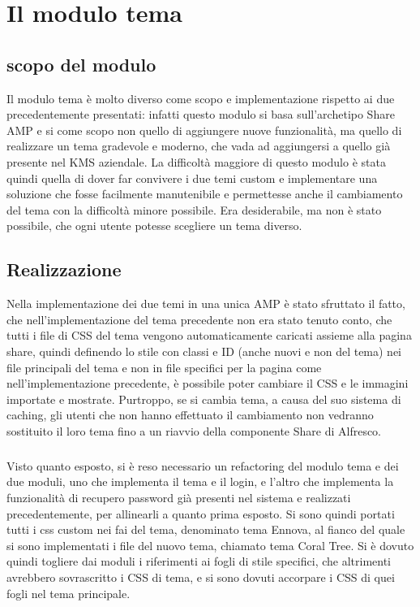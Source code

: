 
\chapter{Il modulo tema}
\label{cap:modulo-tema}

\section{scopo del modulo}
Il modulo tema è molto diverso come scopo e implementazione rispetto ai due precedentemente presentati: infatti questo modulo si basa sull'archetipo Share AMP e si come scopo non quello di aggiungere nuove funzionalità, ma quello di realizzare un tema gradevole e moderno, che vada ad aggiungersi a quello già presente nel KMS aziendale. La difficoltà maggiore di questo modulo è stata quindi quella di dover far convivere i due temi custom e implementare una soluzione che fosse facilmente manutenibile e permettesse anche il cambiamento del tema con la difficoltà minore possibile.
Era desiderabile, ma non è stato possibile, che ogni utente potesse scegliere un tema diverso.
\section{Realizzazione}
Nella implementazione dei due temi in una unica AMP è stato sfruttato il fatto, che nell'implementazione del tema precedente non era stato tenuto conto, che tutti i file di CSS del tema vengono automaticamente caricati assieme alla pagina share, quindi definendo lo stile con classi e ID (anche nuovi e non del tema) nei file principali del tema e non in file specifici per la pagina come nell'implementazione precedente, è possibile poter cambiare il CSS e le immagini importate e mostrate.
Purtroppo, se si cambia tema, a causa del suo sistema di caching, gli utenti che non hanno effettuato il cambiamento non vedranno sostituito il loro tema fino a un riavvio della componente Share di Alfresco.
\paragraph{}Visto quanto esposto, si è reso necessario un refactoring del modulo tema e dei due moduli, uno che implementa il tema e il login, e l'altro che implementa la funzionalità di recupero password già presenti nel sistema e realizzati precedentemente, per allinearli a quanto prima esposto. Si sono quindi portati tutti i css custom nei fai del tema, denominato tema Ennova, al fianco del quale si sono implementati i file del nuovo tema, chiamato tema Coral Tree. Si è dovuto quindi togliere dai moduli i riferimenti ai fogli di stile specifici, che altrimenti avrebbero sovrascritto i CSS di tema, e si sono dovuti accorpare i CSS di quei fogli nel tema principale.
